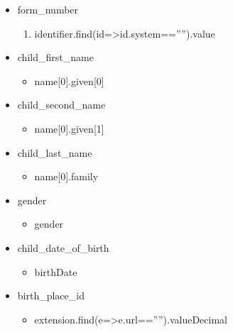 \documentclass[letterpaper,10pt,english]{sphinxmanual}
\begin{document}
\begin{itemize}
\item {} 
\sphinxAtStartPar
form\_number
\begin{enumerate}
%
\item {} 
\sphinxAtStartPar
identifier.find(id=\textgreater{}id.system==””).value

\end{enumerate}

\item {} 
\sphinxAtStartPar
child\_first\_name
\begin{itemize}
\item {} 
\sphinxAtStartPar
name{[}0{]}.given{[}0{]}

\end{itemize}

\item {} 
\sphinxAtStartPar
child\_second\_name
\begin{itemize}
\item {} 
\sphinxAtStartPar
name{[}0{]}.given{[}1{]}

\end{itemize}

\item {} 
\sphinxAtStartPar
child\_last\_name
\begin{itemize}
\item {} 
\sphinxAtStartPar
name{[}0{]}.family

\end{itemize}

\item {} 
\sphinxAtStartPar
gender
\begin{itemize}
\item {} 
\sphinxAtStartPar
gender

\end{itemize}

\item {} 
\sphinxAtStartPar
child\_date\_of\_birth
\begin{itemize}
\item {} 
\sphinxAtStartPar
birthDate

\end{itemize}

\item {} 
\sphinxAtStartPar
birth\_place\_id
\begin{itemize}
\item {} 
\sphinxAtStartPar
extension.find(e=\textgreater{}e.url==””).valueDecimal


\end{itemize}
\end{itemize}
\end{document}

